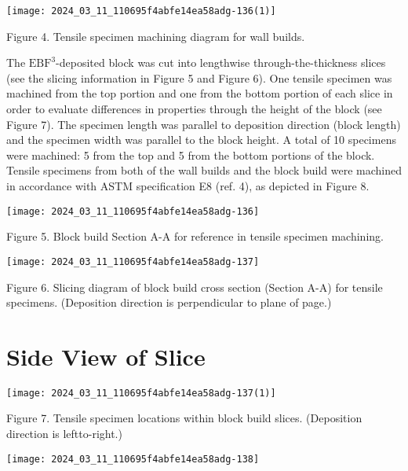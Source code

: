 \documentclass[10pt]{article}
\begin{document}
\begin{center}
\texttt{[image: 2024\_03\_11\_110695f4abfe14ea58adg-136(1)]}
\end{center}

Figure 4. Tensile specimen machining diagram for wall builds.

The $\mathrm{EBF}^{3}$-deposited block was cut into lengthwise through-the-thickness slices (see the slicing information in Figure 5 and Figure 6). One tensile specimen was machined from the top portion and one from the bottom portion of each slice in order to evaluate differences in properties through the height of the block (see Figure 7). The specimen length was parallel to deposition direction (block length) and the specimen width was parallel to the block height. A total of 10 specimens were machined: 5 from the top and 5 from the bottom portions of the block. Tensile specimens from both of the wall builds and the block build were machined in accordance with ASTM specification E8 (ref. 4), as depicted in Figure 8.

\begin{center}
\texttt{[image: 2024\_03\_11\_110695f4abfe14ea58adg-136]}
\end{center}

Figure 5. Block build Section A-A for reference in tensile specimen machining.

\begin{center}
\texttt{[image: 2024\_03\_11\_110695f4abfe14ea58adg-137]}
\end{center}

Figure 6. Slicing diagram of block build cross section (Section A-A) for tensile specimens. (Deposition direction is perpendicular to plane of page.)

\section*{Side View of Slice}
\begin{center}
\texttt{[image: 2024\_03\_11\_110695f4abfe14ea58adg-137(1)]}
\end{center}

Figure 7. Tensile specimen locations within block build slices. (Deposition direction is leftto-right.)

\begin{center}
\texttt{[image: 2024\_03\_11\_110695f4abfe14ea58adg-138]}
\end{center}
\end{document}
